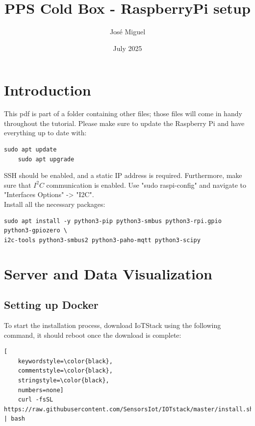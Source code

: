 \documentclass[onecolumn]{article}
\title{
    PPS Cold Box - RaspberryPi setup\\
   
}
\author{
José Miguel\\
}
\date{July 2025}
\begin{document}
\maketitle

\tableofcontents

\newpage
\normalsize




\section{Introduction}
    This pdf is part of a folder containing other files; those files will come in handy throughout the tutorial. Please make sure to update the Raspberry Pi and have everything up to date with:
    

\begin{lstlisting}[numbers=none]
    sudo apt update
    sudo apt upgrade
\end{lstlisting}

    SSH should be enabled, and a static IP address is required. Furthermore, make sure that $I^2C$ communication is enabled. Use "sudo raspi-config" and navigate to "Interfaces Options" -> "I2C". \\

    Install all the necessary packages:

\begin{lstlisting}[numbers=none]
sudo apt install -y python3-pip python3-smbus python3-rpi.gpio python3-gpiozero \
i2c-tools python3-smbus2 python3-paho-mqtt python3-scipy
\end{lstlisting}
    

\section{Server and Data Visualization}

\subsection{Setting up Docker}
To start the installation process, download IoTStack using the following command, it should reboot once the download is complete:

\begin{lstlisting}[
    keywordstyle=\color{black},
    commentstyle=\color{black},
    stringstyle=\color{black},
    numbers=none]
    curl -fsSL https://raw.githubusercontent.com/SensorsIot/IOTstack/master/install.sh | bash
\end{lstlisting}
\end{document}
